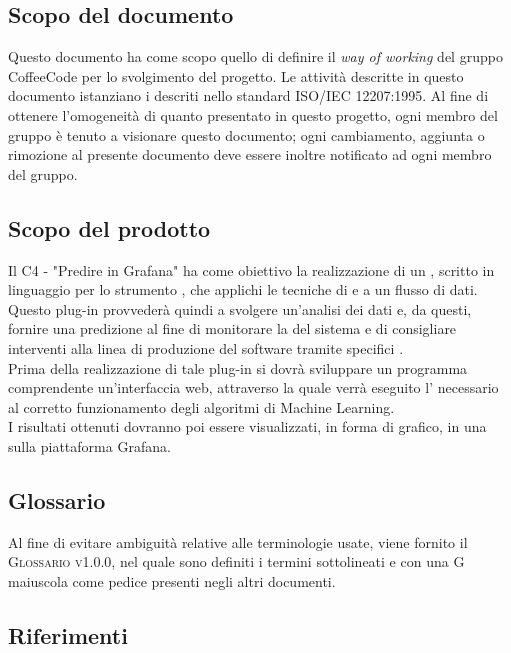 \documentclass[../norme-di-progetto.tex]{subfiles}
\begin{document}
\subsection{Scopo del documento}
Questo documento ha come scopo quello di definire il \emph{way of working} del gruppo CoffeeCode per lo svolgimento del progetto.
Le attività descritte in questo documento istanziano i  descriti nello standard ISO/IEC 12207:1995. Al fine di ottenere l'omogeneità di quanto presentato in questo progetto, ogni membro del gruppo è tenuto a visionare questo documento; ogni cambiamento, aggiunta o rimozione al presente documento deve essere inoltre notificato ad ogni membro del gruppo.

\subsection{Scopo del prodotto}
Il  C4 - "Predire in Grafana" ha come obiettivo la realizzazione di un , scritto in linguaggio  per lo strumento  , che applichi le tecniche di   e  a un flusso di dati. Questo plug-in provvederà quindi a svolgere un'analisi dei dati e, da questi, fornire una predizione al fine di monitorare la  del sistema e di consigliare interventi alla linea di produzione del software tramite specifici . \\
Prima della realizzazione di tale plug-in si dovrà sviluppare un programma comprendente un'interfaccia web, attraverso la quale verrà eseguito l' necessario al corretto funzionamento degli algoritmi di Machine Learning. \\
I risultati ottenuti dovranno poi essere visualizzati, in forma di grafico, in una  sulla piattaforma Grafana.

\subsection{Glossario}
Al fine di evitare ambiguità relative alle terminologie usate, viene fornito il \textsc{Glossario v1.0.0}, nel quale sono definiti i termini sottolineati e con una G maiuscola come pedice presenti negli altri documenti.

\subsection{Riferimenti}
\end{document}
